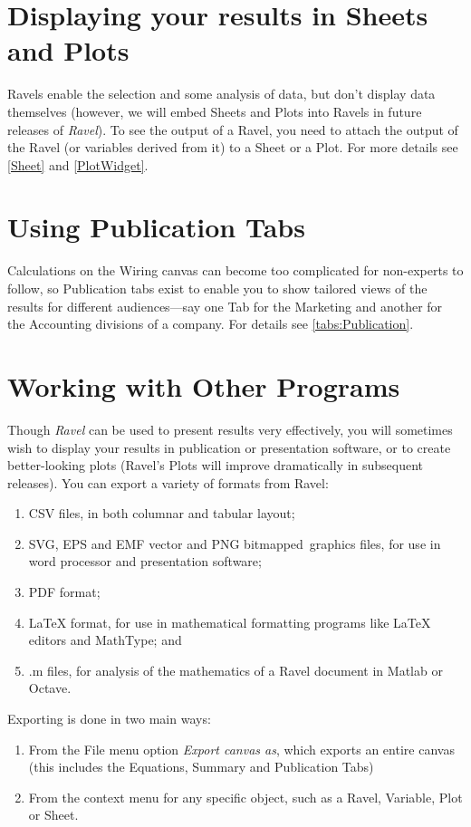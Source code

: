 \section{Displaying your results in Sheets and Plots}

Ravels enable the selection and some analysis of data, but don't display
data themselves (however, we will embed Sheets and Plots into Ravels
in future releases of \emph{Ravel}). To see the output of a Ravel,
you need to attach the output of the Ravel (or variables derived from
it) to a Sheet or a Plot. For more details see \ref{Sheet} and \ref{PlotWidget}.

\section{Using Publication Tabs}

Calculations on the Wiring canvas can become too complicated for non-experts
to follow, so Publication tabs exist to enable you to show tailored
views of the results for different audiences---say one Tab for the
Marketing and another for the Accounting divisions of a company. For
details see \ref{tabs:Publication}.

\section{Working with Other Programs \label{Export}}

Though \emph{Ravel} can be used to present results very effectively,
you will sometimes wish to display your results in publication or
presentation software, or to create better-looking plots (Ravel's
Plots will improve dramatically in subsequent releases). You can export
a variety of formats from Ravel:
\begin{enumerate}
\item CSV files, in both columnar and tabular layout;
\item SVG, EPS and EMF vector and PNG bitmapped~graphics files, for use in word
processor and presentation software;
\item PDF format;
\item LaTeX format, for use in mathematical formatting programs like \LaTeX{}
editors and MathType; and
\item .m files, for analysis of the mathematics of a Ravel document in
  Matlab or Octave.
\end{enumerate}
Exporting is done in two main ways:
\begin{enumerate}
\item From the File menu option \emph{Export canvas as}, which exports an
entire canvas (this includes the Equations, Summary and Publication
Tabs)
\item From the context menu for any specific object, such as a Ravel, Variable,
Plot or Sheet.
\end{enumerate}

